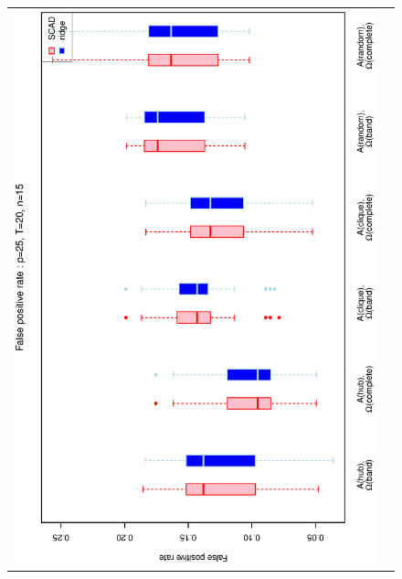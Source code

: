\documentclass[a4paper]{article}
\begin{document}
\begin{figure}[h!]
\centering
\begin{tabular}{cc}
\includegraphics[scale=0.45,angle=270]{ROCfpr25T20N15_5.eps}
\\

\end{tabular}
\end{figure}
\end{document}
